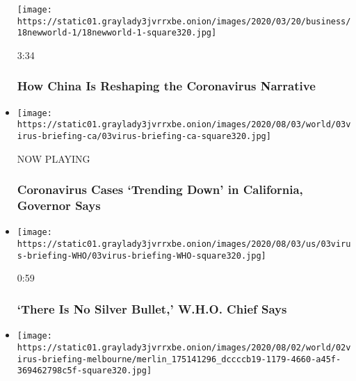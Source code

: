 \begin{itemize}
  \texttt{[image: https://static01.graylady3jvrrxbe.onion/images/2020/03/20/business/18newworld-1/18newworld-1-square320.jpg]}

  3:34

  \hypertarget{how-china-is-reshaping-the-coronavirus-narrative}{%
  \subsubsection{How China Is Reshaping the Coronavirus
  Narrative}\label{how-china-is-reshaping-the-coronavirus-narrative}}
\item
  \texttt{[image: https://static01.graylady3jvrrxbe.onion/images/2020/08/03/world/03virus-briefing-ca/03virus-briefing-ca-square320.jpg]}

  NOW PLAYING

  \hypertarget{coronavirus-cases-trending-down-in-california-governor-says-2}{%
  \subsubsection{Coronavirus Cases `Trending Down' in California,
  Governor
  Says}\label{coronavirus-cases-trending-down-in-california-governor-says-2}}
\item
  \href{https://www.nytimes3xbfgragh.onion/video/world/europe/100000007269932/who-coronavirus-briefing.html?action=click\&module=video-series-bar\&region=header\&pgtype=Article\&playlistId=video/coronavirus-news-update}{}

  \texttt{[image: https://static01.graylady3jvrrxbe.onion/images/2020/08/03/us/03virus-briefing-WHO/03virus-briefing-WHO-square320.jpg]}

  0:59

  \hypertarget{there-is-no-silver-bullet-who-chief-says}{%
  \subsubsection{`There Is No Silver Bullet,' W.H.O. Chief
  Says}\label{there-is-no-silver-bullet-who-chief-says}}
\item
  \href{https://www.nytimes3xbfgragh.onion/video/world/australia/100000007269116/coronavirus-restrictions-melbourne.html?action=click\&module=video-series-bar\&region=header\&pgtype=Article\&playlistId=video/coronavirus-news-update}{}

  \texttt{[image: https://static01.graylady3jvrrxbe.onion/images/2020/08/02/world/02virus-briefing-melbourne/merlin\_175141296\_dccccb19-1179-4660-a45f-369462798c5f-square320.jpg]}


\end{itemize}
